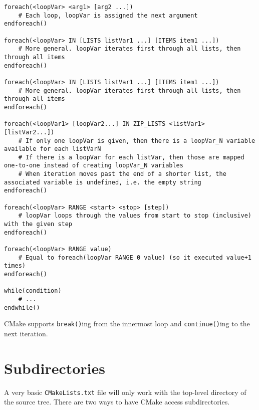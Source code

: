 \documentclass[8pt, table, xcdraw]{article}%
\begin{document}
\begin{lstlisting}
foreach(<loopVar> <arg1> [arg2 ...])
    # Each loop, loopVar is assigned the next argument
endforeach()

foreach(<loopVar> IN [LISTS listVar1 ...] [ITEMS item1 ...])
    # More general. loopVar iterates first through all lists, then through all items
endforeach()

foreach(<loopVar> IN [LISTS listVar1 ...] [ITEMS item1 ...])
    # More general. loopVar iterates first through all lists, then through all items
endforeach()

foreach(<loopVar1> [loopVar2...] IN ZIP_LISTS <listVar1> [listVar2...])
    # If only one loopVar is given, then there is a loopVar_N variable available for each listVarN
    # If there is a loopVar for each listVar, then those are mapped one-to-one instead of creating loopVar_N variables
    # When iteration moves past the end of a shorter list, the associated variable is undefined, i.e. the empty string
endforeach()

foreach(<loopVar> RANGE <start> <stop> [step])
    # loopVar loops through the values from start to stop (inclusive) with the given step
endforeach()

foreach(<loopVar> RANGE value)
    # Equal to foreach(loopVar RANGE 0 value) (so it executed value+1 times)
endforeach()

while(condition)
    # ...
endwhile()
\end{lstlisting}

CMake supports \lstinline{break()}ing from the innermost loop and \lstinline{continue()}ing to the next iteration.

\section{Subdirectories} \label{subdirectories}

A very basic \lstinline{CMakeLists.txt} file will only work with the top-level directory of the source tree. There are two ways to have CMake access subdirectories.
\end{document}
